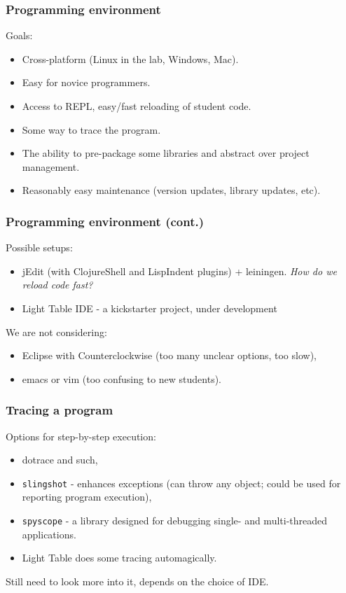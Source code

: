 \documentclass{beamer}
\begin{document}
\begin{frame}
  \frametitle{Programming environment}
Goals:
\begin{itemize}
\item Cross-platform (Linux in the lab, Windows, Mac).
\item Easy for novice programmers.
\item Access to REPL, easy/fast reloading of student code. 
\item Some way to trace the program. 
\item The ability to pre-package some libraries and abstract over project management. 
\item Reasonably easy maintenance (version updates, library updates, etc). 
\end{itemize}
\end{frame}

\begin{frame}
  \frametitle{Programming environment (cont.)}
Possible setups:
\begin{itemize}
\item jEdit  (with ClojureShell and LispIndent plugins) +  leiningen. {\it How do we reload code fast?}
\item Light Table IDE - a kickstarter project, under development
\end{itemize}
We are not considering:
\begin{itemize}
\item Eclipse with Counterclockwise (too many unclear options, too slow), 
\item emacs or vim (too confusing to new students). 
\end{itemize}
\end{frame}

\begin{frame}
  \frametitle{Tracing a program}
Options for step-by-step execution:
\begin{itemize}
\item dotrace and such,
\item {\tt slingshot} - enhances exceptions (can throw any object; could be used for reporting program execution),
\item {\tt spyscope} - a library designed for debugging single- and multi-threaded applications. 
\item Light Table does some tracing automagically. 
\end{itemize}
Still need to look more into it, depends on the choice of IDE. 
\end{frame}
\end{document}
